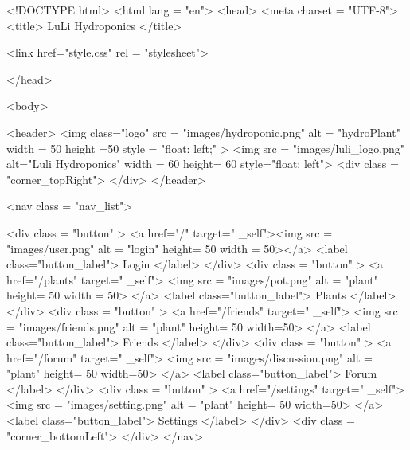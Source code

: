 \documentclass[12pt]{article} %
\begin{document}
    \begin{htmlcode}[caption={Forum HTML}]
    <!DOCTYPE html>
    <html lang = "en">
    <head>
    <meta charset = "UTF-8">
    <title> LuLi Hydroponics </title>
    
    <link href="style.css" 
          rel = "stylesheet">
    
    
    </head>
    
    <body>
     
       <header>
          <img class="logo" src = "images/hydroponic.png" alt = "hydroPlant"  width = 50 height =50 style = "float: left;" >   
          <img src = "images/luli_logo.png" alt="Luli Hydroponics" width = 60 height= 60 style="float: left">
          <div class = "corner_topRight"> </div>
       </header>
    
       <nav class = "nav_list">
          
          <div class = "button" > 
             <a href="/" target=" _self"><img src = "images/user.png" alt = "login" height= 50 width = 50></a>
             <label class="button_label"> Login </label> 
          </div>
          <div class = "button" > 
             <a href="/plants" target=" _self"> <img src = "images/pot.png" alt = "plant" height= 50 width = 50> </a>
             <label class="button_label"> Plants </label> 
          </div>
          <div class = "button" > 
             <a href="/friends" target=" _self"> <img src = "images/friends.png" alt = "plant" height= 50 width=50> </a>
             <label class="button_label"> Friends </label> 
          </div>
          <div class = "button" > 
             <a href="/forum" target=" _self"> <img src = "images/discussion.png" alt = "plant" height= 50 width=50> </a>
             <label class="button_label"> Forum </label> 
          </div>
          <div class = "button" > 
             <a href="/settings" target=" _self"> <img src = "images/setting.png" alt = "plant" height= 50 width=50> </a>
             <label class="button_label"> Settings </label> 
          </div>
             <div class = "corner_bottomLeft"> </div>
         </nav>
         

\end{htmlcode}
\end{document}
